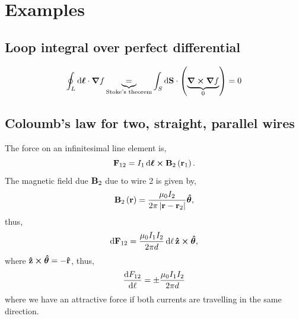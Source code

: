 \documentclass{book}
\begin{document}
\appendix 
\chapter{Examples}
\section{Loop integral over perfect differential}

	\begin{equation}
		\oint_L \dd{\vb*{\ell}} \cdot \grad f \underbrace{=}_{\text{Stoke's theorem}} \int_S \dd{\vb{S}} \cdot\left(\underbrace{\curl{\grad f}}_0\right) = 0
	\end{equation}
\section{Coloumb's law for two, straight, parallel wires}
The force on an infinitesimal line element is,
\begin{equation}
	\vb{F}_{12} = I_1\dd{\vb*{\ell}}\cross\vb{B}_2\left(\vb{r}_1\right).
\end{equation}
The magnetic field due $\vb{B}_2$ due to wire 2 is given by,
\begin{equation}
	\vb{B}_2\left(\vb{r}\right) = \frac{\mu_0 I_2}{2\pi\left|\vb{r} - \vb{r}_2\right|}\vu*{\theta},
\end{equation}
thus,
\begin{equation}
	\dd{\vb{F}_{12}} = \frac{\mu_0 I_1I_2}{2\pi d}\dd{\ell}\vu{z}\cross\vu*{\theta},
\end{equation}
where $\vu{z}\cross\vu*{\theta} = - \vu{r}$, thus,
\begin{equation}
	\dv{F_{12}}{\ell} = \pm \frac{\mu_0 I_1I_2}{2\pi d}
\end{equation}
where we have an attractive force if both currents are travelling in the same direction.
\end{document}
